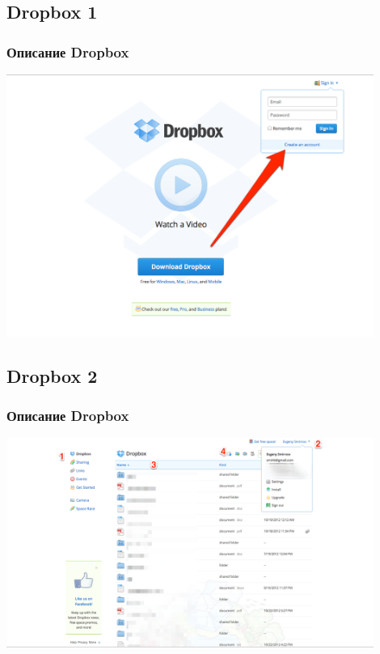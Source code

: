 \documentclass[compress,red]{beamer}
\begin{document}
\subsection{Dropbox 1}
\begin{frame}[fragile]
  \frametitle{Описание Dropbox}
  \centerline{\includegraphics[width=0.9\textwidth]{images/dropbox1.png}}
\end{frame}

\subsection{Dropbox 2}
\begin{frame}[fragile]
  \frametitle{Описание Dropbox}
  \centerline{\includegraphics[width=0.9\textwidth]{images/dropbox2.png}}
\end{frame}
\end{document}
